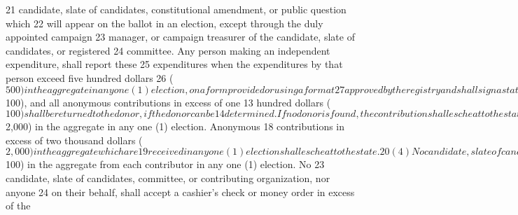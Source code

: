 21 candidate, slate of candidates, constitutional amendment, or public question which
22 will appear on the ballot in an election, except through the duly appointed campaign
23 manager, or campaign treasurer of the candidate, slate of candidates, or registered
24 committee. Any person making an independent expenditure, shall report these
25 expenditures when the expenditures by that person exceed five hundred dollars
26 ($500) in the aggregate in any one (1) election, on a form provided or using a format
27 approved by the registry and shall sign a statement on the form, under penalty of 
UNOFFICIAL COPY 21 RS BR 1691
Page 47 of 68
XXXX Jacketed
1 perjury, that the expenditure was an actual independent expenditure and that there
2 was no prior communication with the campaign on whose behalf it was made.
3 (2) Except as provided in KRS 121.180(10), the solicitation from and contributions by
4 campaign committees, caucus campaign committees, political issues committees,
5 permanent committees, and party executive committees to any religious, charitable,
6 civic, eleemosynary, or other causes or organizations established primarily for the
7 public good is expressly prohibited; except that it shall not be construed as a
8 violation of this section for a candidate or a slate of candidates to contribute to
9 religious, civic, or charitable groups.
10 (3) No candidate, slate of candidates, committee, or contributing organization, nor
11 anyone acting on their behalf, shall accept any anonymous contribution in excess of
12 one hundred dollars ($100), and all anonymous contributions in excess of one
13 hundred dollars ($100) shall be returned to the donor, if the donor can be
14 determined. If no donor is found, the contribution shall escheat to the state. No
15 candidate, slate of candidates, committee, or contributing organization, nor anyone
16 acting on their behalf shall accept anonymous contributions in excess of two
17 thousand dollars ($2,000) in the aggregate in any one (1) election. Anonymous
18 contributions in excess of two thousand dollars ($2,000) in the aggregate which are
19 received in any one (1) election shall escheat to the state.
20 (4) No candidate, slate of candidates, committee, or contributing organization, nor
21 anyone on their behalf, shall accept a cash contribution in excess of one hundred
22 dollars ($100) in the aggregate from each contributor in any one (1) election. No
23 candidate, slate of candidates, committee, or contributing organization, nor anyone
24 on their behalf, shall accept a cashier's check or money order in excess of the
